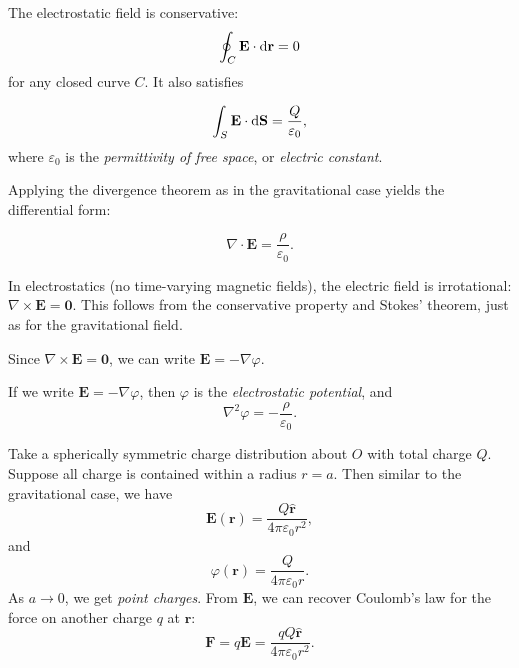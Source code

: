 \documentclass[a4paper]{article}
\begin{document}
The electrostatic field is conservative:
\[
  \oint_C \mathbf{E}\cdot \mathrm{d} \mathbf{r} = 0
\]
for any closed curve $C$. It also satisfies
\begin{law}
  \[
    \int_S \mathbf{E}\cdot \mathrm{d} \mathbf{S} = \frac{Q}{\varepsilon_0},
  \]
  where $\varepsilon_0$ is the \emph{permittivity of free space}, or \emph{electric constant}.
\end{law}

Applying the divergence theorem as in the gravitational case yields the differential form:
\begin{law}
  \[
    \nabla \cdot \mathbf{E} = \frac{\rho}{\varepsilon_0}.
  \]
\end{law}

\begin{rmk}
  In electrostatics (no time-varying magnetic fields), the electric field is irrotational: $\nabla\times \mathbf{E} = \mathbf{0}$. This follows from the conservative property and Stokes' theorem, just as for the gravitational field.
\end{rmk}

Since $\nabla\times \mathbf{E} = \mathbf{0}$, we can write $\mathbf{E} = -\nabla \varphi$.
\begin{defi}
  If we write $\mathbf{E} = -\nabla \varphi$, then $\varphi$ is the \emph{electrostatic potential}, and
  \[
    \nabla^2 \varphi = -\frac{\rho}{\varepsilon_0}.
  \]
\end{defi}

\begin{eg}
  Take a spherically symmetric charge distribution about $O$ with total charge $Q$. Suppose all charge is contained within a radius $r = a$. Then similar to the gravitational case, we have
  \[
    \mathbf{E}(\mathbf{r}) = \frac{Q\hat{\mathbf{r}}}{4\pi \varepsilon_0 r^2},
  \]
  and
  \[
    \varphi(\mathbf{r}) = \frac{Q}{4\pi\varepsilon_0 r}.
  \]
  As $a \to 0$, we get \emph{point charges}. From $\mathbf{E}$, we can recover Coulomb's law for the force on another charge $q$ at $\mathbf{r}$:
  \[
    \mathbf{F} = q\mathbf{E} =\frac{qQ\hat{\mathbf{r}}}{4\pi \varepsilon_0 r^2}.
  \]
\end{eg}
\end{document}
